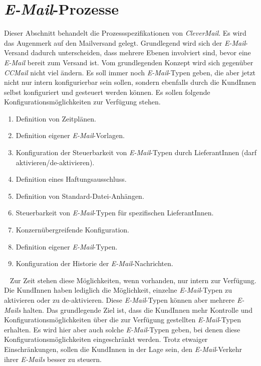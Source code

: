\section{\emph{E-Mail}-Prozesse}
\label{sec:clevermail-prozesse}
Dieser Abschnitt behandelt die Prozessspezifikationen von \emph{CleverMail}. Es wird das Augenmerk auf den Mailversand gelegt. Grundlegend wird sich der \emph{E-Mail}-Versand dadurch unterscheiden, dass mehrere Ebenen involviert sind, bevor eine \emph{E-Mail} bereit zum Versand ist. 
\newline
\newline
Vom grundlegenden Konzept wird sich gegenüber \emph{CCMail} nicht viel ändern. Es soll immer noch \emph{E-Mail}-Typen geben, die aber jetzt nicht nur intern konfigurierbar sein sollen,  sondern ebenfalls durch die KundInnen selbst konfiguriert und gesteuert werden können. Es sollen folgende Konfigurationsmöglichkeiten zur Verfügung stehen.
\begin{enumerate}
	\item Definition von Zeitplänen.
	\item Definition eigener \emph{E-Mail}-Vorlagen.
	\item Konfiguration der Steuerbarkeit von \emph{E-Mail}-Typen durch LieferantInnen (darf aktivieren/de-aktivieren).
	\item Definition eines Haftungsausschluss. 
	\item Definition von Standard-Datei-Anhängen.
	\item Steuerbarkeit von \emph{E-Mail}-Typen für spezifischen LieferantInnen.
	\item Konzernübergreifende Konfiguration.
	\item Definition eigener \emph{E-Mail}-Typen.
	\item Konfiguration der Historie der \emph{E-Mail}-Nachrichten.
\end{enumerate}
\ \newline
Zur Zeit stehen diese Möglichkeiten, wenn vorhanden, nur intern zur Verfügung. Die KundInnen haben lediglich die Möglichkeit, einzelne \emph{E-Mail}-Typen zu aktivieren oder zu de-aktivieren. Diese \emph{E-Mail}-Typen können aber mehrere \emph{E-Mails} halten. Das grundlegende Ziel ist, dass die KundInnen mehr Kontrolle und Konfigurationsmöglichkeiten über die zur Verfügung gestellten \emph{E-Mail}-Typen erhalten. Es wird hier aber auch solche \emph{E-Mail}-Typen geben, bei denen diese Konfigurationsmöglichkeiten eingeschränkt werden. Trotz etwaiger Einschränkungen, sollen die KundInnen in der Lage sein, den \emph{E-Mail}-Verkehr ihrer \emph{E-Mails} besser zu steuern.

